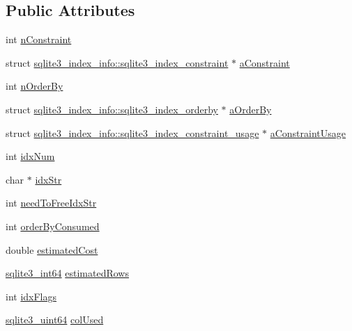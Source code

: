 \subsection*{Public Attributes}
\begin{DoxyCompactItemize}
\item 
int \mbox{\hyperlink{structsqlite3__index__info_ae861993a30ce914a5214eab2579d935a}{n\+Constraint}}
\item 
struct \mbox{\hyperlink{structsqlite3__index__info_1_1sqlite3__index__constraint}{sqlite3\+\_\+index\+\_\+info\+::sqlite3\+\_\+index\+\_\+constraint}} $\ast$ \mbox{\hyperlink{structsqlite3__index__info_a634aa93834e2b47acf34454746c0f248}{a\+Constraint}}
\item 
int \mbox{\hyperlink{structsqlite3__index__info_a3ef850fdc57eddbc8189fe84d0a9044e}{n\+Order\+By}}
\item 
struct \mbox{\hyperlink{structsqlite3__index__info_1_1sqlite3__index__orderby}{sqlite3\+\_\+index\+\_\+info\+::sqlite3\+\_\+index\+\_\+orderby}} $\ast$ \mbox{\hyperlink{structsqlite3__index__info_a6823a68979e19d8e332389361e920ef9}{a\+Order\+By}}
\item 
struct \mbox{\hyperlink{structsqlite3__index__info_1_1sqlite3__index__constraint__usage}{sqlite3\+\_\+index\+\_\+info\+::sqlite3\+\_\+index\+\_\+constraint\+\_\+usage}} $\ast$ \mbox{\hyperlink{structsqlite3__index__info_a79b8a969dd7d582fc2ea3c0fbc5adb56}{a\+Constraint\+Usage}}
\item 
int \mbox{\hyperlink{structsqlite3__index__info_afcee17707a1c147fbd55c23c807fdae3}{idx\+Num}}
\item 
char $\ast$ \mbox{\hyperlink{structsqlite3__index__info_a1a9935e997bd6e3cce048534da7506a7}{idx\+Str}}
\item 
int \mbox{\hyperlink{structsqlite3__index__info_a5410066c067c3891cdf165c70cc4d6b1}{need\+To\+Free\+Idx\+Str}}
\item 
int \mbox{\hyperlink{structsqlite3__index__info_a5515d9de0f37f68d7e0930c20a668b29}{order\+By\+Consumed}}
\item 
double \mbox{\hyperlink{structsqlite3__index__info_aa8b4fe1d2ee38aab57ba5e1da00d7830}{estimated\+Cost}}
\item 
\mbox{\hyperlink{sqlite3_8h_a0a4d3e6c1ad46f90e746b920ab6ca0d2}{sqlite3\+\_\+int64}} \mbox{\hyperlink{structsqlite3__index__info_adcdf25dcf9848a6fedf539bb9c921b7f}{estimated\+Rows}}
\item 
int \mbox{\hyperlink{structsqlite3__index__info_a8acf2a7efbc3e193cf01d2afbd44fdbb}{idx\+Flags}}
\item 
\mbox{\hyperlink{sqlite3_8h_a181c20ecfd72bc6627635746d382c610}{sqlite3\+\_\+uint64}} \mbox{\hyperlink{structsqlite3__index__info_a99787169e2f78c0728bdb339c4107a2e}{col\+Used}}
\end{DoxyCompactItemize}



